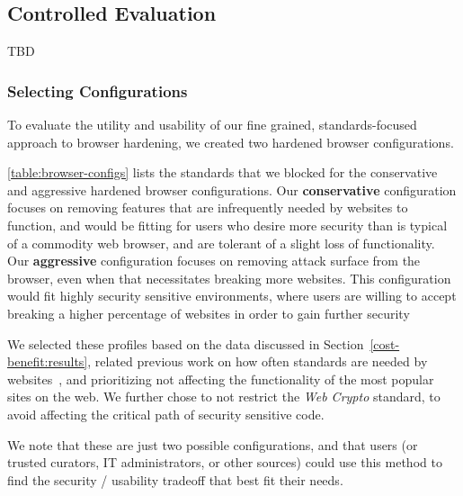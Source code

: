 \subsection{Controlled Evaluation}
TBD

\subsubsection{Selecting Configurations}
\label{current-web:extension:configurations}



To evaluate the utility and usability of our fine grained, standards-focused
approach to browser hardening, we created two hardened browser configurations.

\ref{table:browser-configs} lists the standards that we blocked for
the conservative and aggressive hardened browser configurations.
Our \textbf{conservative} configuration focuses on removing features that are infrequently needed by websites to function, and would be fitting for users who desire more
security than is typical of a commodity web browser, and are tolerant of a
slight loss of functionality.  Our \textbf{aggressive} configuration focuses on removing
attack surface from the browser, even when that necessitates breaking more websites.
This configuration would fit highly security sensitive environments, where users
are willing to accept breaking a higher percentage of websites in order to gain further security

We selected these profiles based on the data discussed in Section~\ref{cost-benefit:results}, related
previous work on how often standards are needed by websites~\cite{snyder2016browser},
and prioritizing not affecting the functionality of the most popular sites on the
web.  We further chose to not restrict the \emph{Web Crypto} standard, to
avoid affecting the critical path of security sensitive code.

We note that these are just two possible configurations, and that users
(or trusted curators, IT administrators, or other sources) could
use this method to find the security / usability tradeoff that best fit their needs.




